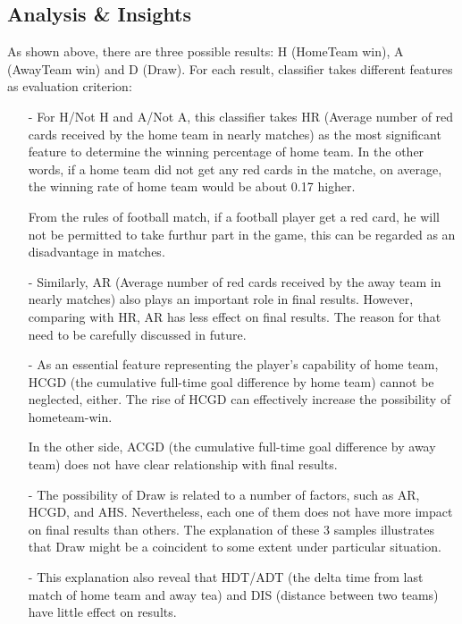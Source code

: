 \documentclass{article}
\begin{document}
\subsection{Analysis \& Insights}
As shown above, there are three possible results: H (HomeTeam win), A (AwayTeam win) and D (Draw). For each result, classifier takes different features as  evaluation criterion:
\begin{itemize}
\item[-] For H/Not H and A/Not A, this classifier takes HR (Average number of red cards received by the home team in nearly matches) as the most significant feature to determine the winning percentage of home team. In the other words, if a home team did not get any red cards in the matche, on average, the winning rate of home team would be about 0.17 higher. 

From the rules of football match, if a football player get a red card, he will not be permitted to take furthur part in the game, this can be regarded as an disadvantage in matches.\\

\item[-] Similarly, AR (Average number of red cards received by the away team in nearly matches) also plays an important role in final results. However, comparing with HR, AR has less effect on final results. The reason for that need to be carefully discussed in future. 

\item[-] As an essential feature representing the player's capability of home team, HCGD (the cumulative full-time goal difference by home team) cannot be neglected, either. The rise of HCGD can effectively increase the possibility of hometeam-win.

In the other side, ACGD (the cumulative full-time goal difference by away team) does not have clear relationship with final results.

\item[-] The possibility of Draw is related to a number of factors, such as AR, HCGD, and AHS. Nevertheless, each one of them does not have more impact on final results than others. The explanation of these 3 samples illustrates that Draw might be a coincident to some extent under particular situation.

\item[-] This explanation also reveal that HDT/ADT (the delta time from last match of home team and away tea) and DIS (distance between two teams) have little effect on results. 

\end{itemize}
\end{document}
